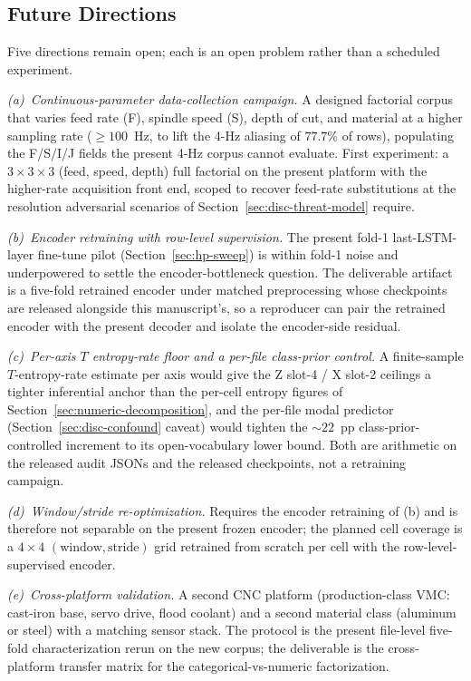 \documentclass[sensors,article,submit,moreauthors,pdftex]{Definitions/mdpi}
\begin{document}
\subsection{Future Directions}
\label{sec:roadmap}

Five directions remain open; each is an open problem rather than a scheduled experiment.

\emph{(a)~Continuous-parameter data-collection campaign.} A designed factorial corpus that varies feed rate (F), spindle speed (S), depth of cut, and material at a higher sampling rate ($\geq\!100$~Hz, to lift the 4-Hz aliasing of $77.7\%$ of rows), populating the F/S/I/J fields the present 4-Hz corpus cannot evaluate. First experiment: a $3\!\times\!3\!\times\!3$ (feed, speed, depth) full factorial on the present platform with the higher-rate acquisition front end, scoped to recover feed-rate substitutions at the resolution adversarial scenarios of Section~\ref{sec:disc-threat-model} require.

\emph{(b)~Encoder retraining with row-level supervision.} The present fold-1 last-LSTM-layer fine-tune pilot (Section~\ref{sec:hp-sweep}) is within fold-1 noise and underpowered to settle the encoder-bottleneck question. The deliverable artifact is a five-fold retrained encoder under matched preprocessing whose checkpoints are released alongside this manuscript's, so a reproducer can pair the retrained encoder with the present decoder and isolate the encoder-side residual.

\emph{(c)~Per-axis $T$ entropy-rate floor and a per-file class-prior control.} A finite-sample $T$-entropy-rate estimate per axis would give the Z slot-4 / X slot-2 ceilings a tighter inferential anchor than the per-cell entropy figures of Section~\ref{sec:numeric-decomposition}, and the per-file modal predictor (Section~\ref{sec:disc-confound} caveat) would tighten the $\sim\!22$~pp class-prior-controlled increment to its open-vocabulary lower bound. Both are arithmetic on the released audit JSONs and the released checkpoints, not a retraining campaign.

\emph{(d)~Window/stride re-optimization.} Requires the encoder retraining of (b) and is therefore not separable on the present frozen encoder; the planned cell coverage is a $4\!\times\!4$ $(\text{window}, \text{stride})$ grid retrained from scratch per cell with the row-level-supervised encoder.

\emph{(e)~Cross-platform validation.} A second CNC platform (production-class VMC: cast-iron base, servo drive, flood coolant) and a second material class (aluminum or steel) with a matching sensor stack. The protocol is the present file-level five-fold characterization rerun on the new corpus; the deliverable is the cross-platform transfer matrix for the categorical-vs-numeric factorization.
\end{document}
